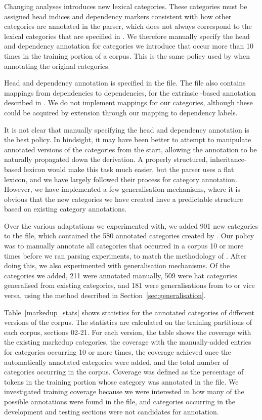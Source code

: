 Changing \ccg analyses introduces new lexical categories. These categories must
be assigned head indices and dependency markers consistent with how other
categories are annotated in the \candc parser, which does not always correspond
to the lexical categories that are specified in \ccgbank. We therefore manually
specify the head and dependency annotation for categories we introduce that
occur more than 10 times in the training portion of a corpus. This is the same
policy used by \citet{clark:cl07} when annotating the original \ccgbank
categories.

Head and dependency annotation is specified in the \markedup file. The file also
contains mappings from \ccgbank dependencies to \depbank dependencies, for the
extrinsic \depbank-based annotation described in \citet{clark:acl07parseval}. We
do not implement \depbank mappings for our categories, although these could be
acquired by extension through our mapping to \ccgbank dependency labels.


It is not clear that manually specifying the head and dependency annotation is
the best policy. In hindsight, it may have been better to attempt to manipulate
annotated versions of the categories from the start, allowing the annotation to
be naturally propagated down the derivation. A properly structured,
inheritance-based lexicon would make this task much easier, but the \candc
parser uses a flat lexicon, and we have largely followed their process for
category annotation. However, we have implemented a few generalisation
mechanisms, where it is obvious that the new categories we have created have a
predictable structure based on existing category annotations.

Over the various adaptations we experimented with, we added 901 new categories
to the \markedup file, which contained the 580 annotated categories created by
\citeauthor{clark:cl07}. Our policy was to manually annotate all categories that
occurred in a corpus 10 or more times before we ran parsing experiments, to
match the methodology of \citet{clark:cl07}. After doing this, we also
experimented with generalisation mechanisms. Of the categories we added, 211
were annotated manually, 509 were hat categories generalised from existing
\markedup categories, and 181 were generalisations from  to  or
vice versa, using the method described in Section~\ref{sec:generalisation}.

Table~\ref{markedup_stats} shows statistics for the annotated categories of
different versions of the corpus. The statistics are calculated on the training
partitions of each corpus, sections 02-21. For each version, the table shows the
coverage with the existing \candc markedup categories, the coverage with the
manually-added entries for categories occurring 10 or more times, the coverage
achieved once the automatically annotated categories were
added, and the total number of categories occurring in the corpus. Coverage was
defined as the percentage of tokens in the training portion whose category was
annotated in the \markedup file. We investigated training coverage because we
were interested in how many of the possible annotations were found in the
\markedup file, and categories occurring in the development and testing sections
were not candidates for annotation.

